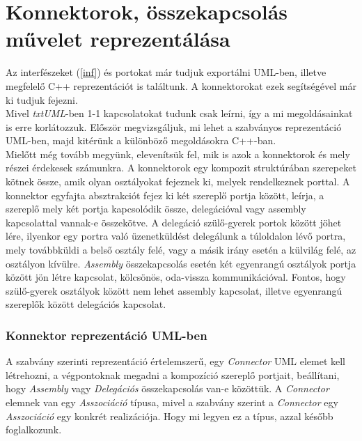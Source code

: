 \documentclass[a4paper,12pt]{report}
\begin{document}
\section{Konnektorok, összekapcsolás művelet reprezentálása} \label{connect}
Az interfészeket (\ref{inf}) és portokat már tudjuk exportálni UML-ben, illetve megfelelő C++ reprezentációt is találtunk. A konnektorokat ezek segítségével már ki tudjuk fejezni. \\
Mivel \textit{txtUML}-ben 1-1 kapcsolatokat tudunk csak leírni, így a mi megoldásainkat is erre korlátozzuk. Először megvizsgáljuk, mi lehet a szabványos reprezentáció UML-ben, majd kitérünk a különböző megoldásokra C++-ban. \\
Mielőtt még tovább megyünk, elevenítsük fel, mik is azok a konnektorok és mely részei érdekesek számunkra. A konnektorok egy kompozit struktúrában szerepeket kötnek össze, amik olyan osztályokat fejeznek ki, melyek rendelkeznek porttal. A konnektor egyfajta absztrakciót fejez ki két szereplő portja között, leírja, a szereplő mely két portja kapcsolódik össze, delegációval vagy assembly kapcsolattal vannak-e összekötve. A delegáció szülő-gyerek portok között jöhet lére, ilyenkor egy portra való üzenetküldést delegálunk a túloldalon lévő portra, mely továbbküldi a belső osztály felé, vagy a másik irány esetén a külvilág felé, az osztályon kívülre. \textit{Assembly} összekapcsolás esetén két egyenrangú osztályok portja között jön létre kapcsolat, kölcsönös, oda-vissza kommunikációval. Fontos, hogy szülő-gyerek osztályok között nem lehet assembly kapcsolat, illetve egyenrangú szereplők között delegációs kapcsolat.
\subsubsection{Konnektor reprezentáció UML-ben}
A szabvány szerinti reprezentáció értelemszerű, egy \textit{Connector} UML elemet kell létrehozni, a végpontoknak megadni a kompozíció szereplő portjait, beállítani, hogy \textit{Assembly} vagy \textit{Delegációs} összekapcsolás van-e közöttük. A \textit{Connector} elemnek van egy \textit{Asszociáció} típusa, mivel a szabvány szerint a \textit{Connector} egy \textit{Asszociáció} egy konkrét realizációja. Hogy mi legyen ez a típus, azzal később foglalkozunk.
\end{document}
